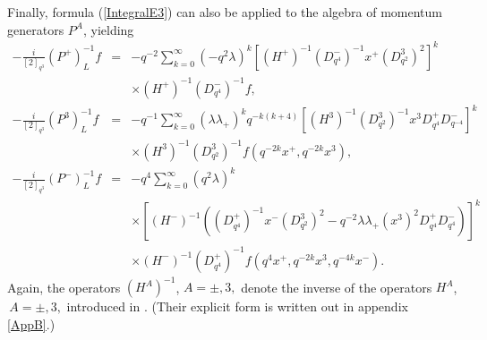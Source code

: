 \documentclass[a4paper,11pt,oneside]{article}
\begin{document}
Finally, formula 
(\ref{IntegralE3}) can also be applied to the algebra of 
momentum generators $P^A$, yielding 
\begin{eqnarray}
-%
\frac{i}{\left[ 2\right] _{q^{3}}}\left( P^{+}\right) _{L}^{-1}f
&=&-q^{-2}\sum_{k=0}^{\infty }\left( -q^{2}\lambda \right) ^{k}\left[ \left(
H^{+}\right) ^{-1}\left( D_{q^{4}}^{-}\right) ^{-1}x^{+}\left(
D_{q^{2}}^{3}\right) ^{2}\right] ^{k}  \label{Impuls} \\
&&\times \left( H^{+}\right) ^{-1}\left( D_{q^{4}}^{-}\right) ^{-1}f, 
\nonumber \\
-\frac{i}{\left[ 2\right] _{q^{3}}}\left( P^{3}\right) _{L}^{-1}f
&=&-q^{-1}\sum_{k=0}^{\infty }\left( \lambda \lambda _{+}\right)
^{k}q^{-k\left( k+4\right) }\left[ \left( H^{3}\right) ^{-1}\left(
D_{q^{2}}^{3}\right) ^{-1}x^{3}D_{q^{4}}^{+}D_{q^{-4}}^{-}\right] ^{k} 
\nonumber \\
&&\times \left( H^{3}\right) ^{-1}\left( D_{q^{2}}^{3}\right) ^{-1}f\left(
q^{-2k}x^{+},q^{-2k}x^{3}\right) ,  \nonumber \\
-\frac{i}{\left[ 2\right] _{q^{3}}}\left( P^{-}\right) _{L}^{-1}f
&=&-q^{4}\sum_{k=0}^{\infty }\left( q^{2}\lambda \right) ^{k}  \nonumber \\
&&\times \left[ \left( H^{-}\right) ^{-1}\left( \left( D_{q^{4}}^{+}\right)
^{-1}x^{-}\left( D_{q^{2}}^{3}\right) ^{2}-q^{-2}\lambda \lambda _{+}\left(
x^{3}\right) ^{2}D_{q^{4}}^{+}D_{q^{4}}^{-}\right) \right] ^{k}  \nonumber \\
&&\times \left( H^{-}\right) ^{-1}\left( D_{q^{4}}^{+}\right) ^{-1}f\left(
q^{4}x^{+},q^{-2k}x^{3},q^{-4k}x^{-}\right) .  \nonumber
\end{eqnarray}
\linebreak Again, the operators $\left( H^{A}\right) ^{-1}$, $A=\pm ,3,$
denote the inverse of the operators $H^{A}$, $\,A=\pm ,3,$ introduced in 
\cite{BW01}. (Their explicit form is written out in appendix 
\ref{AppB}.)
\end{document}
